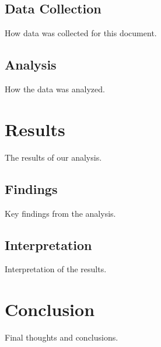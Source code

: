 \documentclass{article}
\begin{document}
\subsection{Data Collection}
How data was collected for this document.

\subsection{Analysis}
How the data was analyzed.

\section{Results}
The results of our analysis.

\subsection{Findings}
Key findings from the analysis.

\subsection{Interpretation}
Interpretation of the results.

\section{Conclusion}
Final thoughts and conclusions.
\end{document}
